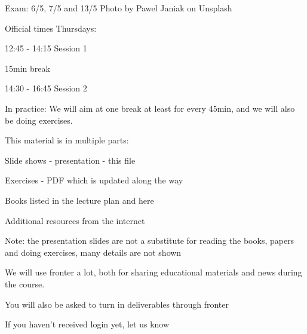 \documentclass[Screen16to9,17pt]{foils}
\begin{document}
Exam: 6/5, 7/5 and 13/5 {\hfill\small Photo by Pawel Janiak on Unsplash}



Official times Thursdays:
\begin{list2}
\item 12:45 - 14:15 Session 1\\

\item 15min break\\

\item 14:30 - 16:45 Session 2\\
\end{list2}

In practice:
We will aim at one break at least for every 45min, and we will also be doing exercises.



\begin{list1}
\item This material is in multiple parts:
\begin{list2}
\item Slide shows - presentation - this file
\item Exercises - PDF which is updated along the way
\end{list2}
\item Books listed in the lecture plan and here
\item Additional resources from the internet
\end{list1}

Note: the presentation slides are not a substitute for reading the books, papers and doing exercises, many details are not shown




We will use fronter a lot, both for sharing educational materials and news during the course.

You will also be asked to turn in deliverables through fronter


\vskip 5mm
\centerline{If you haven't received login yet, let us know}


\end{document}
